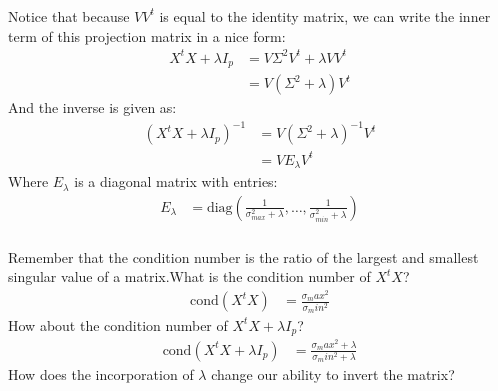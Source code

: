 \begin{frame}[fragile] \frametitle{}

Notice that because $VV^t$ is equal to the identity matrix, we
can write the inner term of this projection matrix in a nice form:
\begin{align*}
X^t X + \lambda I_p &= V \Sigma^2 V^t + \lambda V V^t \\
&= V(\Sigma^2 + \lambda)V^t
\end{align*}
\pause And the inverse is given as:
\begin{align*}
(X^t X + \lambda I_p)^{-1}
&= V(\Sigma^2 + \lambda)^{-1}V^t \\
&= V E_{\lambda} V^t
\end{align*}
\pause Where $E_{\lambda}$ is a diagonal matrix with entries:
\begin{align*}
E_{\lambda} &=
\text{diag} \left( \frac{1}{\sigma^2_{max} + \lambda}, \ldots, \frac{1}{\sigma^2_{min} + \lambda}\right)
\end{align*}

\end{frame}

\begin{frame}[fragile] \frametitle{}

Remember that the condition number is the ratio of the largest and smallest
singular value of a matrix.\pause What is the condition number of $X^tX$?
\begin{align}
\text{cond} (X^t X) &= \frac{\sigma_max^2}{\sigma_min^2}
\end{align}
\pause How about the condition number of $X^t X + \lambda I_p$?
\begin{align}
\text{cond} (X^t X + \lambda I_p) &= \frac{\sigma_max^2 + \lambda}{\sigma_min^2 + \lambda}
\end{align}
\pause How does the incorporation of $\lambda$ change our ability to invert the
matrix?

\end{frame}

